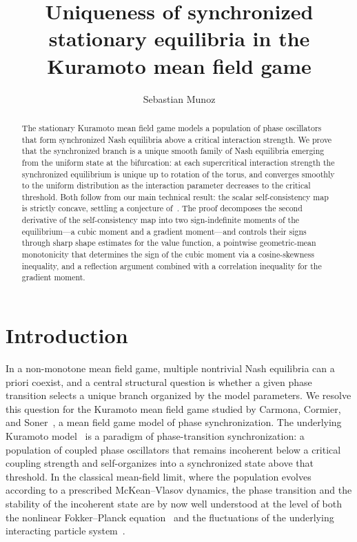 \documentclass{amsart}
\title{Uniqueness of synchronized stationary equilibria in the Kuramoto mean field game}
\author{Sebastian Munoz}
\date{}
\begin{document}
\begin{abstract}
The stationary Kuramoto mean field game models a population of phase
oscillators that form synchronized Nash equilibria above a critical
interaction strength. We prove that the synchronized branch is a
unique smooth family of Nash equilibria emerging from the uniform
state at the bifurcation: at each supercritical interaction strength
the synchronized equilibrium is unique up to rotation of the torus,
and converges smoothly to the uniform distribution as
the interaction parameter decreases to the critical threshold. Both follow
from our main technical result: the scalar self-consistency map is strictly concave, settling a
conjecture of~\cite{CCS}. The proof decomposes the second derivative
of the self-consistency map into two sign-indefinite moments of the
equilibrium---a cubic moment and a gradient moment---and controls
their signs through sharp shape estimates for the value function, a
pointwise geometric-mean monotonicity that determines the sign of the
cubic moment via a cosine-skewness inequality, and a reflection argument combined with
a correlation inequality for the gradient moment.
\end{abstract}

\maketitle

\section{Introduction}\label{sec:intro}

In a non-monotone mean field game, multiple nontrivial Nash equilibria
can a priori coexist, and a central structural question is whether a
given phase transition selects a unique branch organized by the model
parameters. We resolve this question for
the Kuramoto mean field game studied by Carmona, Cormier, and
Soner~\cite{CCS}, a mean field game
model of phase synchronization. The underlying Kuramoto
model~\cite{Kuramoto,Strogatz,ABPVS} is a paradigm
of phase-transition synchronization: a population of coupled phase
oscillators that remains incoherent below a critical coupling strength
and self-organizes into a synchronized state above that threshold. In the classical
mean-field limit, where the population evolves according to a
prescribed McKean--Vlasov dynamics, the phase transition and the
stability of the incoherent state are by now well understood at the
level of both the nonlinear Fokker--Planck equation~\cite{GPP} and the
fluctuations of the underlying interacting particle system~\cite{BGP}.
\end{document}
